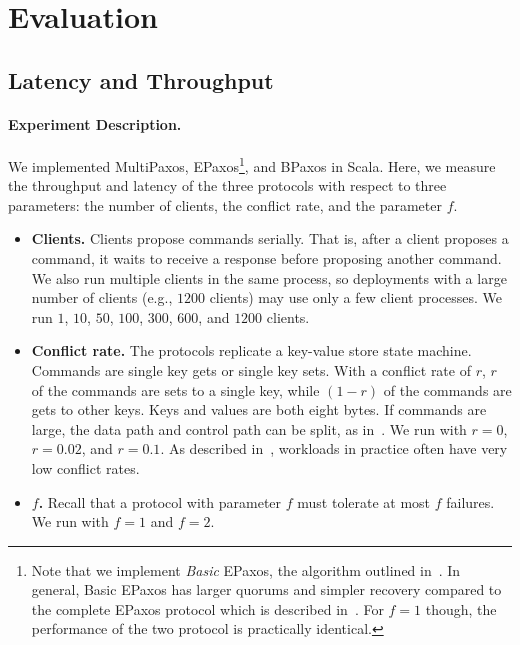 \section{Evaluation}

\subsection{Latency and Throughput}
{}

\paragraph{Experiment Description.}
We implemented MultiPaxos, EPaxos\footnote{%
  Note that we implement \emph{Basic} EPaxos, the algorithm outlined
  in~\cite{moraru2013proof}. In general, Basic EPaxos has larger quorums and
  simpler recovery compared to the complete EPaxos protocol which is described
  in~\cite{moraru2013there}. For $f=1$ though, the performance of the two
  protocol is practically identical.
}, and BPaxos in Scala. Here, we
measure the throughput and latency of the three protocols with respect to three
parameters: the number of clients, the conflict rate, and the parameter $f$.

\begin{itemize}
  \item \textbf{Clients.}
    Clients propose commands serially. That is, after a client proposes a
    command, it waits to receive a response before proposing another command.
    We also run multiple clients in the same process, so deployments with a
    large number of clients (e.g., $1200$ clients) may use only a few client
    processes. We run $1$, $10$, $50$, $100$, $300$, $600$, and $1200$ clients.

  \item \textbf{Conflict rate.}
    The protocols replicate a key-value store state machine. Commands are
    single key gets or single key sets. With a conflict rate of $r$, $r$ of the
    commands are sets to a single key, while $(1 - r)$ of the commands are gets
    to other keys. Keys and values are both eight bytes. If commands are large,
    the data path and control path can be split, as in~\cite{biely2012s}. We
    run with $r=0$, $r=0.02$, and $r=0.1$. As described
    in~\cite{moraru2013there}, workloads in practice often have very low
    conflict rates.

  \item \textbf{$f$.}
    Recall that a protocol with parameter $f$ must tolerate at most $f$ failures.
    We run with $f=1$ and $f=2$.
\end{itemize}

